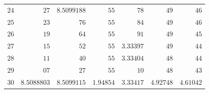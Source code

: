 \begin{center}
\begin{tabular}{||r||r|r|r|r|r|r||}
\(24\) & \(27\) & \(8.5099188\) & \(55\) & \(78\) & \(49\) & \(46\)\\
\(25\) & \(23\) & \(76\) & \(55\) & \(84\) & \(49\) & \(46\)\\
\(26\) & \(19\) & \(64\) & \(55\) & \(91\) & \(49\) & \(45\)\\
\(27\) & \(15\) & \(52\) & \(55\) & \(3.33397\) & \(49\) & \(44\)\\
\(28\) & \(11\) & \(40\) & \(55\) & \(3.33404\) & \(48\) & \(44\)\\
\(29\) & \(07\) & \(27\) & \(55\) & \(10\) & \(48\) & \(43\)\\[3pt]
\(30\) & \(8.5088803\) & \(8.5099115\) & \(1.94854\) & \(3.33417\) & \(4.92748\) & \(4.61042\)\\
\hline\hline
\end{tabular}
\end{center}
\endgroup
\clearpage

